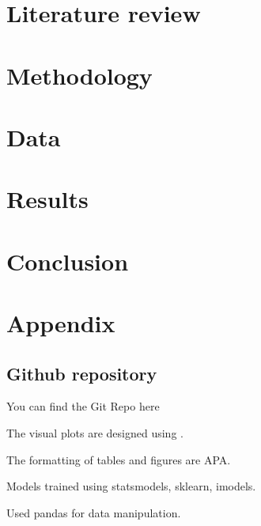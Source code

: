 \documentclass[a4paper,11pt]{article}
\begin{document}
\section{Literature review} \label{sec:litrev}
	
\section{Methodology} \label{sec:method}
    
\section{Data} \label{sec:data}
    
\section{Results} \label{sec:results}
	
\section{Conclusion} \label{sec:conclusion}
	

\newpage
 
 

\newpage
\appendix
\section{Appendix} \label{sec:appendix}
\subsection{Github repository}
You can find the Git Repo here

The visual plots are designed using .

The formatting of tables and figures are APA.

Models trained using statsmodels, sklearn, imodels.

Used pandas for data manipulation.


\end{document}
